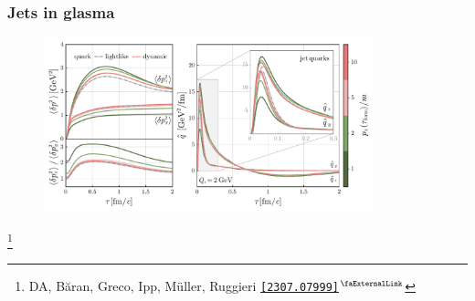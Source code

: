 \documentclass[aspectratio=169,11pt,usenames,dvipsnames]{beamer}
\renewcommand{\thefootnote}{\color{customblue}\faPaperPlaneO}
\newcommand\blfootnote[1]{%
  \begingroup
  \renewcommand\thefootnote{}\footnote{#1}%
  \addtocounter{footnote}{-1}%
  \endgroup
}
\begin{document}
\begin{frame}
    \frametitle{Jets in glasma}
    \begin{center}
        \begin{figure}
            \centering
            \includegraphics[width=0.85\textwidth]{images/hp23_mom_broad_qhat_anis_wong_vs_qhat.pdf}
        \end{figure}
    \end{center}
    \vspace{-20pt}
    \blfootnote{\scriptsize DA, Băran, Greco, Ipp, Müller, Ruggieri  \href{https://arxiv.org/abs/2307.07999}{{\color{custompink}\texttt{[2307.07999]}$^\text{\scalebox{0.9}{\faExternalLink}}$}}}
\end{frame}

\end{document}
